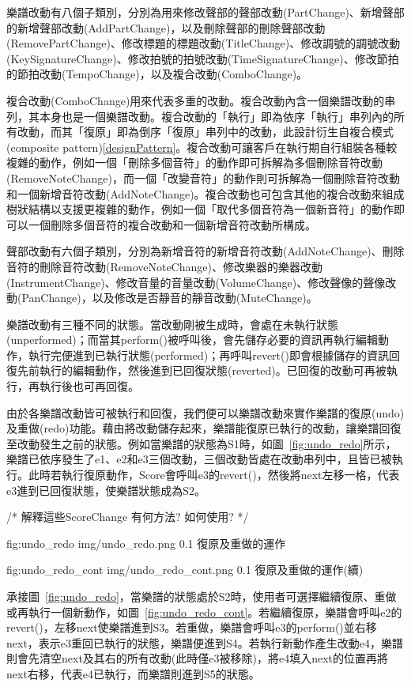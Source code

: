 \documentclass[12pt,a4paper,oneside]{report}
\begin{document}
樂譜改動有八個子類別，分別為用來修改聲部的聲部改動(PartChange)、新增聲部的新增聲部改動(AddPartChange)，以及刪除聲部的刪除聲部改動(RemovePartChange)、修改標題的標題改動(TitleChange)、修改調號的調號改動(KeySignatureChange)、修改拍號的拍號改動(TimeSignatureChange)、修改節拍的節拍改動(TempoChange)，以及複合改動(ComboChange)。

複合改動(ComboChange)用來代表多重的改動。複合改動內含一個樂譜改動的串列，其本身也是一個樂譜改動。複合改動的「執行」即為依序「執行」串列內的所有改動，而其「復原」即為倒序「復原」串列中的改動，此設計衍生自複合模式(composite pattern)\ref{designPattern}。複合改動可讓客戶在執行期自行組裝各種較複雜的動作，例如一個「刪除多個音符」的動作即可拆解為多個刪除音符改動(RemoveNoteChange)，而一個「改變音符」的動作則可拆解為一個刪除音符改動和一個新增音符改動(AddNoteChange)。複合改動也可包含其他的複合改動來組成樹狀結構以支援更複雜的動作，例如一個「取代多個音符為一個新音符」的動作即可以一個刪除多個音符的複合改動和一個新增音符改動所構成。

聲部改動有六個子類別，分別為新增音符的新增音符改動(AddNoteChange)、刪除音符的刪除音符改動(RemoveNoteChange)、修改樂器的樂器改動(InstrumentChange)、修改音量的音量改動(VolumeChange)、修改聲像的聲像改動(PanChange)，以及修改是否靜音的靜音改動(MuteChange)。

樂譜改動有三種不同的狀態。當改動剛被生成時，會處在未執行狀態(unperformed)；而當其perform()被呼叫後，會先儲存必要的資訊再執行編輯動作，執行完便進到已執行狀態(performed)；再呼叫revert()即會根據儲存的資訊回復先前執行的編輯動作，然後進到已回復狀態(reverted)。已回復的改動可再被執行，再執行後也可再回復。

由於各樂譜改動皆可被執行和回復，我們便可以樂譜改動來實作樂譜的復原(undo)及重做(redo)功能。藉由將改動儲存起來，樂譜能復原已執行的改動，讓樂譜回復至改動發生之前的狀態。例如當樂譜的狀態為S1時，如圖~\ref{fig:undo_redo}所示，樂譜已依序發生了e1、e2和e3三個改動，三個改動皆處在改動串列中，且皆已被執行。此時若執行復原動作，Score會呼叫e3的revert()，然後將next左移一格，代表e3進到已回復狀態，使樂譜狀態成為S2。

/*  
解釋這些ScoreChange 有何方法? 如何使用?   
*/ 


\figurewithcaption
{fig:undo_redo}
{img/undo_redo.png}
{0.1}
{復原及重做的運作}

\figurewithcaption
{fig:undo_redo_cont}
{img/undo_redo_cont.png}
{0.1}
{復原及重做的運作(續)}

承接圖~\ref{fig:undo_redo}，當樂譜的狀態處於S2時，使用者可選擇繼續復原、重做或再執行一個新動作，如圖~\ref{fig:undo_redo_cont}。若繼續復原，樂譜會呼叫e2的revert()，左移next使樂譜進到S3。若重做，樂譜會呼叫e3的perform()並右移next，表示e3重回已執行的狀態，樂譜便進到S4。若執行新動作產生改動e4，樂譜則會先清空next及其右的所有改動(此時僅e3被移除)，將e4填入next的位置再將next右移，代表e4已執行，而樂譜則進到S5的狀態。
\end{document}

